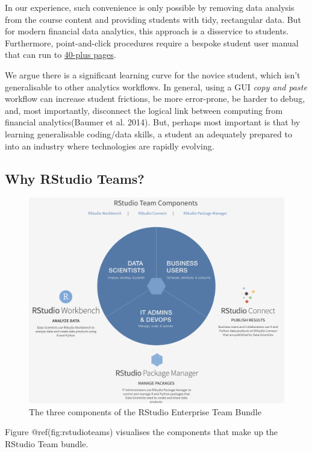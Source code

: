 \documentclass{article}
\begin{document}
In our experience, such convenience is only possible by removing data
analysis from the course content and providing students with tidy,
rectangular data. But for modern financial data analytics, this approach
is a disservice to students. Furthermore, point-and-click procedures
require a bespoke student user manual that can run to
\href{https://github.com/barryquinn1/FMLmaterial/blob/27d8094fee39fa0284d3a0bfc10e38dcd3bebcac/Introducing\%20Stata.pdf}{40-plus
pages}.

We argue there is a significant learning curve for the novice student,
which isn't generalisable to other analytics workflows. In general,
using a GUI \emph{copy and paste} workflow can increase student
frictions, be more error-prone, be harder to debug, and, most
importantly, disconnect the logical link between computing from
financial analytics(Baumer et al. 2014). But, perhaps most important is
that by learning generalisable coding/data skills, a student an
adequately prepared to into an industry where technologies are rapidly
evolving.

\hypertarget{why-rstudio-teams}{%
\subsection{Why RStudio Teams?}\label{why-rstudio-teams}}

\begin{figure}

{\centering \includegraphics[width=0.7\linewidth]{img/Team} 

}

\caption{The three components of the RStudio Enterprise Team Bundle}\label{fig:rstudioteams}
\end{figure}

Figure @ref(fig:rstudioteams) visualises the components that make up the
RStudio Team bundle.
\end{document}
